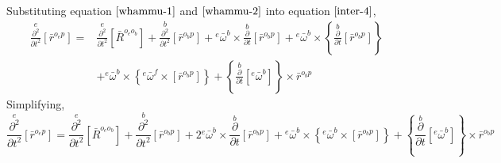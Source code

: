 \documentclass[a4paper, 12pt]{report}
\begin{document}
\begin{center}
Substituting equation $\ref{whammu-1}$ and $\ref{whammu-2}$ into equation $\ref{inter-4}$,
\begin{align*}\overset{e}{\frac{\partial^{2}}{\partial t^{2}}}[\bar{r}^{o_{e}p}]    =&    \overset{e}{\frac{\partial^{2}}{\partial t^{2}}}[\bar{R}^{o_{e}o_{b}}]     +   \overset{b}{\frac{\partial^{2}}{\partial t^{2}}}[\bar{r}^{o_{b}p}] + {}^{e}\bar{\omega}^{b}\times\overset{b}{\frac{\partial}{\partial t}}[\bar{r}^{o_{b}p}]     +   {}^{e}\bar{\omega}^{b}\times\left\{\overset{b}{\frac{\partial}{\partial t}}\left[\bar{r}^{o_{b}p}\right]\right\}   \\&+   {}^{e}\bar{\omega}^{b}\times\left\{{}^{e}\bar{\omega}^{f}\times\left[\bar{r}^{o_{b}p}\right]\right\}    +    \left\{\overset{b}{\frac{\partial}{\partial t}}[{}^{e}\bar{\omega}^{b}]\right\}\times\bar{r}^{o_{b}p}\end{align*}
Simplifying,
\begin{equation}\overset{e}{\frac{\partial^{2}}{\partial t^{2}}}[\bar{r}^{o_{e}p}]    =    \overset{e}{\frac{\partial^{2}}{\partial t^{2}}}[\bar{R}^{o_{e}o_{b}}]     +   \overset{b}{\frac{\partial^{2}}{\partial t^{2}}}[\bar{r}^{o_{b}p}] + 2{}^{e}\bar{\omega}^{b}\times\overset{b}{\frac{\partial}{\partial t}}[\bar{r}^{o_{b}p}]    +   {}^{e}\bar{\omega}^{b}\times\left\{{}^{e}\bar{\omega}^{b}\times\left[\bar{r}^{o_{b}p}\right]\right\}    +    \left\{\overset{b}{\frac{\partial}{\partial t}}[{}^{e}\bar{\omega}^{b}]\right\}\times\bar{r}^{o_{b}p}\label{esidisi1}\end{equation}


\end{center}
\end{document}
